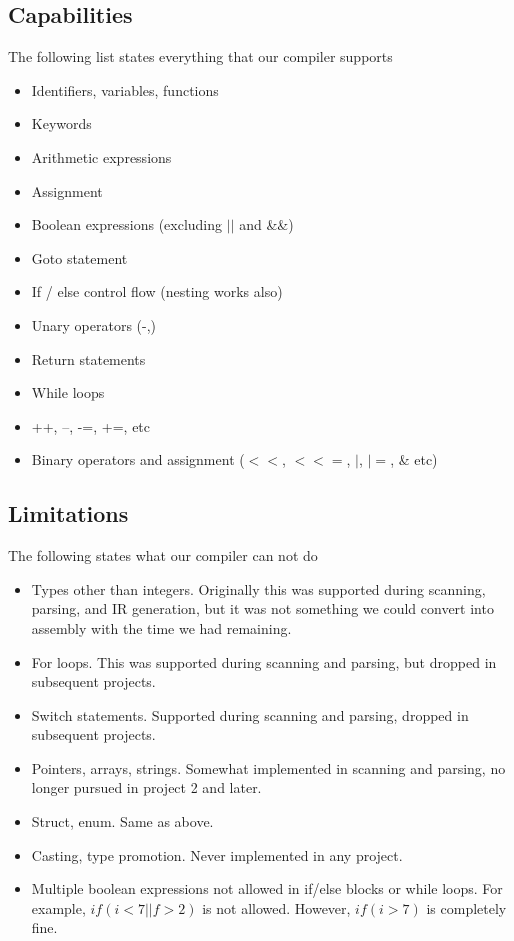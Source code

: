 \documentclass{scrartcl}
\begin{document}
\subsection{Capabilities}
The following list states everything that our compiler supports
\begin{itemize}
    \item Identifiers, variables, functions
    \item Keywords
    \item Arithmetic expressions
    \item Assignment
    \item Boolean expressions (excluding $||$ and \&\&)
    \item Goto statement
    \item If / else control flow (nesting works also)
    \item Unary operators (-,\texttildelow)
    \item Return statements
    \item While loops
    \item ++, --, -=, +=, etc
    \item Binary operators and assignment ($<<$, $<<=$, $|$, $|=$, \& etc)
\end{itemize}
\subsection{Limitations}
The following states what our compiler can not do
\begin{itemize}
	\item Types other than integers. Originally this was supported during scanning, parsing, and IR generation, but it was not something we could convert into assembly with the time we had remaining.
	\item For loops. This was supported during scanning and parsing, but dropped in subsequent projects.
	\item Switch statements. Supported during scanning and parsing, dropped in subsequent projects.
	\item Pointers, arrays, strings. Somewhat implemented in scanning and parsing, no longer pursued in project 2 and later.
	\item Struct, enum. Same as above.
	\item Casting, type promotion. Never implemented in any project.
	\item Multiple boolean expressions not allowed in if/else blocks or while loops. For example, $if(i<7 || f > 2)$ is not allowed. However, $if(i > 7)$ is completely fine.
	
\end{itemize}
\end{document}
